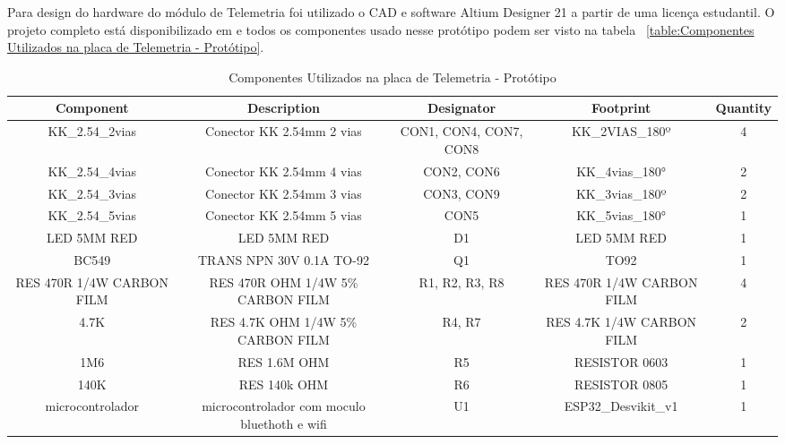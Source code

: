 \documentclass[../poliXuniversity_hospital_-USP-report.tex]{subfiles}
\begin{document}
Para design do hardware do módulo de Telemetria foi utilizado o CAD e software Altium Designer 21 \cite{altium21} a partir de uma licença estudantil. O projeto completo está disponibilizado em \cite{github_modulos} e todos os componentes usado nesse protótipo podem ser visto na tabela ~\ref{table:Componentes Utilizados na placa de Telemetria - Protótipo}.

\begin{table}[!h]
\caption{Componentes Utilizados na placa de Telemetria - Protótipo}
\centering
\begin{adjustbox}{width=\columnwidth,center}
\begin{tabular}{|c|c|c|c|c|}
\hline
Component                   & Description                                    & Designator               & Footprint                   & Quantity \\ \hline
KK\_2.54\_2vias             & Conector KK 2.54mm 2   vias                    & CON1, CON4, CON7,   CON8 & KK\_2VIAS\_180º             & 4        \\ \hline
KK\_2.54\_4vias             & Conector KK 2.54mm 4   vias                    & CON2, CON6               & KK\_4vias\_180°             & 2        \\ \hline
KK\_2.54\_3vias             & Conector KK 2.54mm 3   vias                    & CON3, CON9               & KK\_3vias\_180º             & 2        \\ \hline
KK\_2.54\_5vias             & Conector KK 2.54mm 5   vias                    & CON5                     & KK\_5vias\_180°             & 1        \\ \hline
LED 5MM RED                 & LED 5MM RED                                    & D1                       & LED 5MM RED                 & 1        \\ \hline
BC549                       & TRANS NPN 30V 0.1A   TO-92                     & Q1                       & TO92                        & 1        \\ \hline
RES 470R 1/4W   CARBON FILM & RES 470R OHM 1/4W 5\%   CARBON FILM            & R1, R2, R3, R8           & RES 470R 1/4W CARBON   FILM & 4        \\ \hline
4.7K                        & RES 4.7K OHM 1/4W 5\%   CARBON FILM            & R4, R7                   & RES 4.7K 1/4W CARBON   FILM & 2        \\ \hline
1M6                         & RES 1.6M OHM                                   & R5                       & RESISTOR 0603               & 1        \\ \hline
140K                        & RES 140k OHM                                   & R6                       & RESISTOR 0805               & 1        \\ \hline
microcontrolador            & microcontrolador com   moculo bluethoth e wifi & U1                       & ESP32\_Desvikit\_v1         & 1        \\ \hline


\end{tabular}
\end{adjustbox}
\end{table}
\end{document}
